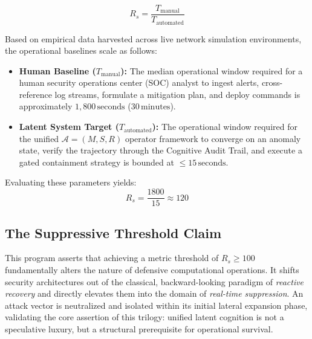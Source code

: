 \begin{equation}
    R_s = \frac{T_{\text{manual}}}{T_{\text{automated}}}
\end{equation}

Based on empirical data harvested across live network simulation environments, the operational baselines scale as follows:
\begin{itemize}
    \item \textbf{Human Baseline ($T_{\text{manual}}$):} The median operational window required for a human security operations center (SOC) analyst to ingest alerts, cross-reference log streams, formulate a mitigation plan, and deploy commands is approximately $1,800\,\text{seconds}$ ($30\,\text{minutes}$).
    \item \textbf{Latent System Target ($T_{\text{automated}}$):} The operational window required for the unified $\mathcal{A} = (M,S,R)$ operator framework to converge on an anomaly state, verify the trajectory through the Cognitive Audit Trail, and execute a gated containment strategy is bounded at $\le 15\,\text{seconds}$.
\end{itemize}

Evaluating these parameters yields:
\begin{equation}
    R_s = \frac{1800}{15} \approx 120
\end{equation}

\subsection{The Suppressive Threshold Claim}
This program asserts that achieving a metric threshold of $R_s \ge 100$ fundamentally alters the nature of defensive computational operations. It shifts security architectures out of the classical, backward-looking paradigm of \textit{reactive recovery} and directly elevates them into the domain of \textit{real-time suppression}. An attack vector is neutralized and isolated within its initial lateral expansion phase, validating the core assertion of this trilogy: unified latent cognition is not a speculative luxury, but a structural prerequisite for operational survival.